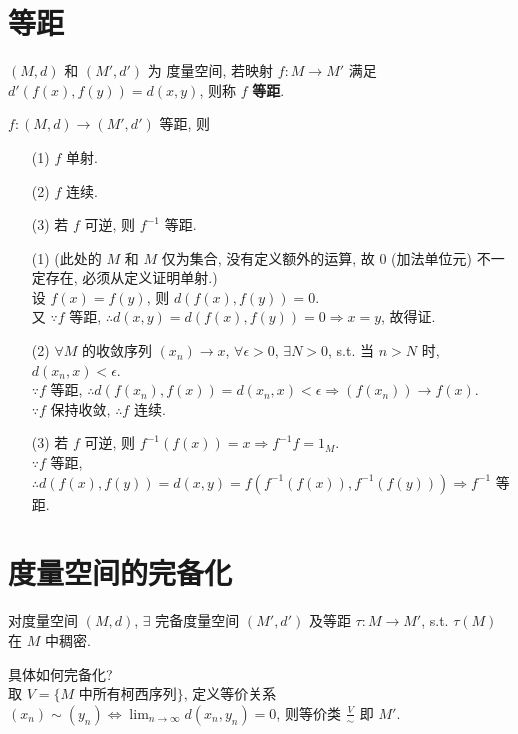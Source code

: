 \documentclass{note}
\begin{document}
\section{等距}
\begin{df}[等距]
    $(M,d)$ 和 $(M',d')$ 为 度量空间, 若映射 $f:M\rightarrow M'$ 满足 $d'(f(x),f(y))=d(x,y)$, 则称 $f$ \textbf{等距}.
\end{df}

\begin{thm}
    $f:(M,d)\rightarrow(M',d')$ 等距, 则
    \begin{itemize}
        \item[(1)] $f$ 单射.
        \item[(2)] $f$ 连续.
        \item[(3)] 若 $f$ 可逆, 则 $f^{-1}$ 等距.
    \end{itemize}
\end{thm}
\begin{pf}
    \begin{itemize}
        \item[(1)] (此处的 $M$ 和 $M$ 仅为集合, 没有定义额外的运算, 故 $0$ (加法单位元) 不一定存在, 必须从定义证明单射.)\\
        设 $f(x)=f(y)$, 则 $d(f(x),f(y))=0$.\\
        又 $\because f$ 等距, $\therefore d(x,y)=d(f(x),f(y))=0\Longrightarrow x=y$, 故得证.
        \item[(2)] $\forall M$ 的收敛序列 $(x_n)\rightarrow x$, $\forall\epsilon>0$, $\exists N>0$, s.t. 当 $n>N$ 时, $d(x_n,x)<\epsilon$.\\
        $\because f$ 等距, $\therefore d(f(x_n),f(x))=d(x_n,x)<\epsilon\Longrightarrow(f(x_n))\rightarrow f(x)$.\\
        $\because f$ 保持收敛, $\therefore f$ 连续.
        \item[(3)] 若 $f$ 可逆, 则 $f^{-1}(f(x))=x\Longrightarrow f^{-1}f=1_M$.\\
        $\because f$ 等距, $\therefore d(f(x),f(y))=d(x,y)=f(f^{-1}(f(x)),f^{-1}(f(y)))\Longrightarrow f^{-1}$ 等距.
    \end{itemize}
\end{pf}

\section{度量空间的完备化}
\begin{thm}
    对度量空间 $(M,d)$, $\exists$ 完备度量空间 $(M',d')$ 及等距 $\tau:M\rightarrow M'$, s.t. $\tau(M)$ 在 $M$ 中稠密.
\end{thm}

具体如何完备化?\\
取 $V=\{M\text{ 中所有柯西序列}\}$, 定义等价关系 $(x_n)\sim(y_n)\Longleftrightarrow\lim_{n\rightarrow\infty}d(x_n,y_n)=0$, 则等价类 $\frac{V}{\sim}$ 即 $M'$.
\ifx\allfiles\undefined
\end{document}
